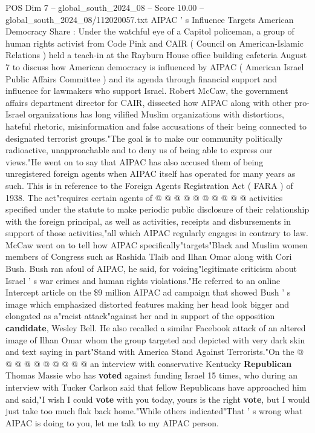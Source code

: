 \begin{textsample}{POS Dim 7 – global\_south\_2024\_08 – Score 10.00 – global\_south\_2024\_08/112020057.txt}  \label{ex:f7_pos_183}
AIPAC ' s Influence Targets American Democracy Share : Under the watchful eye of a Capitol policeman, a group of human rights activist from Code Pink and CAIR ( Council on American-Islamic Relations ) held a teach-in at the Rayburn House office building cafeteria August 7 to discuss how American democracy is influenced by AIPAC ( American Israel Public Affairs Committee ) and its agenda through financial support and influence for lawmakers who support Israel.
Robert McCaw, the government affairs department director for CAIR, dissected how AIPAC along with other pro-Israel organizations has long vilified Muslim organizations with distortions, hateful rhetoric, misinformation and false accusations of their being connected to designated terrorist groups."The goal is to make our community politically radioactive, unapproachable and to deny us of being able to express our views."He went on to say that AIPAC has also accused them of being unregistered foreign agents when AIPAC itself has operated for many years as such.
This is in reference to the Foreign Agents Registration Act ( FARA ) of 1938.
The act"requires certain agents of @ @ @ @ @ @ @ @ @ @ activities specified under the statute to make periodic public disclosure of their relationship with the foreign principal, as well as activities, receipts and disbursements in support of those activities,"all which AIPAC regularly engages in contrary to law.
McCaw went on to tell how AIPAC specifically"targets"Black and Muslim women members of Congress such as Rashida Tlaib and Ilhan Omar along with Cori Bush.
Bush ran afoul of AIPAC, he said, for voicing"legitimate criticism about Israel ' s war crimes and human rights violations."He referred to an online Intercept article on the \$9 million AIPAC ad campaign that showed Bush ' s image which emphasized distorted features making her head look bigger and elongated as a"racist attack"against her and in support of the opposition \textbf{candidate}, Wesley Bell.
He also recalled a similar Facebook attack of an altered image of Ilhan Omar whom the group targeted and depicted with very dark skin and text saying in part"Stand with America Stand Against Terrorists."On the @ @ @ @ @ @ @ @ @ @ an interview with conservative Kentucky \textbf{Republican} Thomas Massie who has \textbf{voted} against funding Israel 15 times, who during an interview with Tucker Carlson said that fellow Republicans have approached him and said,"I wish I could \textbf{vote} with you today, yours is the right \textbf{vote}, but I would just take too much flak back home."While others indicated"That ' s wrong what AIPAC is doing to you, let me talk to my AIPAC person.

\end{textsample}
